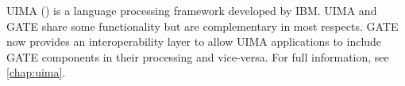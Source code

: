 %
%
%
%
%
%
%
%
%
%


UIMA () is a language
processing framework developed by IBM.  UIMA and GATE share some
functionality but are complementary in most respects. GATE now provides an
interoperability layer to allow UIMA applications to include GATE components
in their processing and vice-versa.  For full information, see \Chapthing
\ref{chap:uima}.

